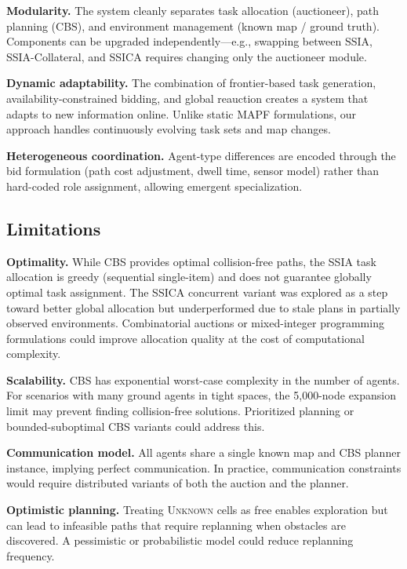\documentclass[conference]{IEEEtran}
\begin{document}
\textbf{Modularity.} The system cleanly separates task allocation (auctioneer), path planning (CBS), and environment management (known map / ground truth). Components can be upgraded independently---e.g., swapping between SSIA, SSIA-Collateral, and SSICA requires changing only the auctioneer module.

\textbf{Dynamic adaptability.} The combination of frontier-based task generation, availability-constrained bidding, and global reauction creates a system that adapts to new information online. Unlike static MAPF formulations, our approach handles continuously evolving task sets and map changes.

\textbf{Heterogeneous coordination.} Agent-type differences are encoded through the bid formulation (path cost adjustment, dwell time, sensor model) rather than hard-coded role assignment, allowing emergent specialization.

\subsection{Limitations}

\textbf{Optimality.} While CBS provides optimal collision-free paths, the SSIA task allocation is greedy (sequential single-item) and does not guarantee globally optimal task assignment. The SSICA concurrent variant was explored as a step toward better global allocation but underperformed due to stale plans in partially observed environments. Combinatorial auctions or mixed-integer programming formulations could improve allocation quality at the cost of computational complexity.

\textbf{Scalability.} CBS has exponential worst-case complexity in the number of agents. For scenarios with many ground agents in tight spaces, the 5{,}000-node expansion limit may prevent finding collision-free solutions. Prioritized planning or bounded-suboptimal CBS variants could address this.

\textbf{Communication model.} All agents share a single known map and CBS planner instance, implying perfect communication. In practice, communication constraints would require distributed variants of both the auction and the planner.

\textbf{Optimistic planning.} Treating \textsc{Unknown} cells as free enables exploration but can lead to infeasible paths that require replanning when obstacles are discovered. A pessimistic or probabilistic model could reduce replanning frequency.
\end{document}
